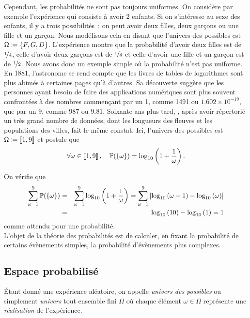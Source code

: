 \documentclass{magnolia}
\begin{document}
Cependant, les probabilités ne sont pas toujours uniformes. On considère par exemple
l'expérience
qui consiste à avoir 2 enfants. Si on s'intéresse au sexe des enfants, il y a trois
possibilités~: on peut avoir deux filles, deux garçons ou une fille et un garçon. Nous
modélisons cela en disant que l'univers des possibles est $\Omega\coloneqq\left\{F,G,D\right\}$.
L'expérience montre que la probabilité d'avoir deux filles est de $\nicefrac{1}{4}$,
celle d'avoir deux garçons est de $\nicefrac{1}{4}$ et celle d'avoir une fille et un
garçon est de $\nicefrac{1}{2}$. Nous avons donc un exemple simple où la
probabilité n'est pas uniforme.\\

En 1881, l'astronome
 se rend compte que les livres de tables de logarithmes sont plus
abimés à certaines pages qu'à d'autres. Sa découverte suggère que les personnes
ayant besoin de faire des applications numériques sont plus souvent confrontées à des nombres
commençant par un 1, comme 1491 ou $1.602\times 10^{-19}$, que par un 9, comme $987$ ou $9.81$.
Soixante ans plus tard, , après avoir
répertorié un très grand nombre de données, dont les longueurs des fleuves et les populations
des villes, fait le même constat. Ici, l'univers des possibles est $\Omega\coloneqq\left\llbracket 1,9\right\rrbracket$
et  postule que
\[\forall \omega\in\left\llbracket 1,9\right\rrbracket,\quad \mathbb{P}(\left\{\omega\right\})=\log_{10}\left(1+\frac{1}{\omega}\right).\]

\begin{center}

\end{center}
\noindent
On vérifie que
\begin{eqnarray*}
\sum_{\omega=1}^9 \mathbb{P}(\left\{\omega\right\})
&=& \sum_{\omega=1}^9 \log_{10}\left(1+\frac{1}{\omega}\right)
= \sum_{\omega=1}^9 \left[\log_{10}\left(\omega+1\right)-\log_{10}\left(\omega\right)\right]\\
&=& \log_{10}\left(10\right)-\log_{10}\left(1\right) = 1
\end{eqnarray*}
comme attendu pour une probabilité.\\

L'objet de la théorie des probabilités est de calculer, en fixant la probabilité de certains
évènements simples, la probabilité d'évènements plus complexes.

\subsection{Espace probabilisé}

\begin{definition}
Étant donné une expérience aléatoire, on appelle \emph{univers des possibles} ou simplement
\emph{univers} tout ensemble fini $\Omega$ où chaque élément $\omega\in\Omega$ représente une
\emph{réalisation} de l'expérience.
\end{definition}
\end{document}
